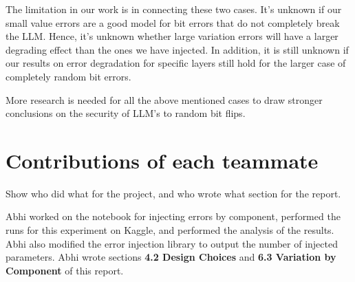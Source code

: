 The limitation in our work is in connecting these two cases. It's unknown if our small value errors are a good model for bit errors that do not completely break the LLM. Hence, it's unknown whether
large variation errors will have a larger degrading effect than the ones we have injected. In addition, it is still unknown if our results on error degradation for specific layers still hold for
the larger case of completely random bit errors.

More research is needed for all the above mentioned cases to draw stronger conclusions on the security of LLM's to random bit flips.

\section{Contributions of each teammate}
Show who did what for the project, and who wrote what section for the report. 

Abhi worked on the notebook for injecting errors by component, performed the runs for this experiment on Kaggle, and performed the analysis of the results. Abhi also modified the error injection library to output the number of injected parameters. Abhi wrote sections \textbf{4.2 Design Choices} and \textbf{6.3 Variation by Component} of this report.



